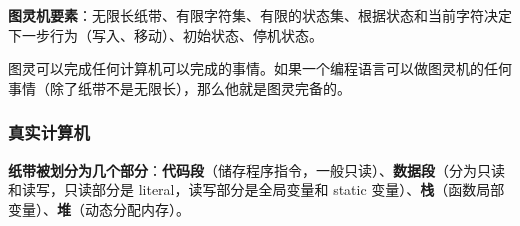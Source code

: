 
\begin{issues}
\issueDraft
\end{issues}

\textbf{图灵机要素}：无限长纸带、有限字符集、有限的状态集、根据状态和当前字符决定下一步行为（写入、移动）、初始状态、停机状态。

图灵可以完成任何计算机可以完成的事情。如果一个编程语言可以做图灵机的任何事情（除了纸带不是无限长），那么他就是图灵完备的。

\subsubsection{真实计算机}
\textbf{纸带被划分为几个部分}：\textbf{代码段}（储存程序指令，一般只读）、\textbf{数据段}（分为只读和读写，只读部分是 literal，读写部分是全局变量和 static 变量）、\textbf{栈}（函数局部变量）、\textbf{堆}（动态分配内存）。
